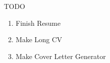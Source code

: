 \documentclass{article}
\begin{document}
\large{TODO}
\begin{enumerate}
    \item Finish Resume\\
    \item Make Long CV\\
    \item Make Cover Letter Generator
\end{enumerate}
\end{document}
